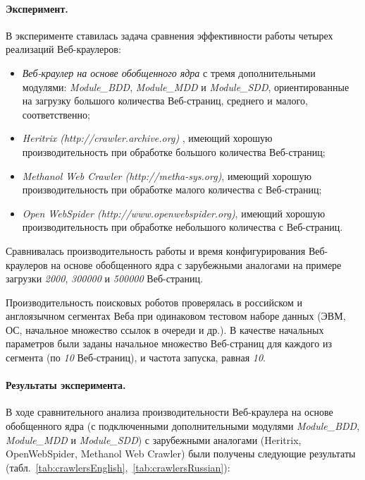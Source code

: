 \paragraph{Эксперимент.} В эксперименте ставилась задача сравнения эффективности работы четырех реализаций Веб-краулеров:
\begin{itemize}
	\item \textit{Веб-краулер на основе обобщенного ядра} с тремя дополнительными модулями: \textit{Module\_BDD}, \textit{Module\_MDD} и \textit{Module\_SDD}, ориентированные на загрузку большого количества Веб-страниц, среднего и малого, соответственно;
	\item \textit{Heritrix (http://crawler.archive.org)} \cite{MohrKimptonStack}, имеющий хорошую производительность при обработке большого количества Веб-страниц;
	\item \textit{Methanol Web Crawler (http://metha-sys.org)}, имеющий хорошую производительность при обработке малого количества с Веб-страниц;
	\item \textit{Open WebSpider (http://www.openwebspider.org)}, имеющий хорошую производительность при обработке небольшого количества с Веб-страниц.
\end{itemize}

Сравнивалась производительность работы и время конфигурирования Веб-краулеров на основе обобщенного ядра с зарубежными аналогами на примере загрузки \textit{2000}, \textit{300000} и \textit{500000} Веб-страниц.

Производительность поисковых роботов проверялась в российском и англоязычном сегментах Веба при одинаковом тестовом наборе данных (ЭВМ, ОС, начальное множество ссылок в очереди и др.). В качестве начальных параметров были заданы начальное множество Веб-страниц для каждого из сегмента (по \textit{10} Веб-страниц), и частота запуска, равная \textit{10}.

\paragraph{Результаты эксперимента.} В ходе сравнительного анализа производительности Веб-краулера на основе обобщенного ядра (с подключенными дополнительными модулями \textit{Module\_BDD}, \textit{Module\_MDD} и \textit{Module\_SDD}) с зарубежными аналогами (Heritrix, OpenWebSpider, Methanol Web Crawler) были получены следующие результаты (табл.~\cref{tab:crawlersEnglish},~\cref{tab:crawlersRussian}):

